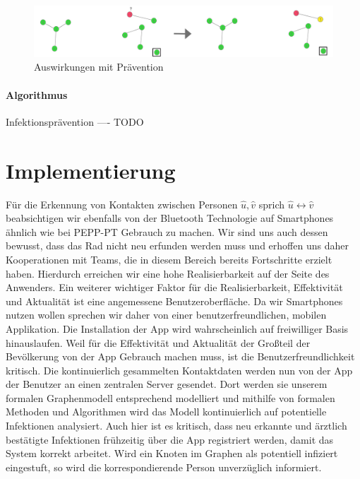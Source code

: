 \documentclass[12pt]{article}
\begin{document}
\begin{figure}[h]
    \centering
    \includegraphics[width=\textwidth]{res/prevention_proactive}
    \caption{Auswirkungen mit Prävention}
    \label{fig:prevention_proactive}
\end{figure}

\paragraph{Algorithmus} Infektionsprävention
---- TODO
\newpage

\section{Implementierung}
Für die Erkennung von Kontakten zwischen Personen $\hat{u}, \hat{v}$ sprich $\hat{u} \leftrightarrow \hat{v}$ beabsichtigen wir ebenfalls von der Bluetooth Technologie auf Smartphones ähnlich wie bei PEPP-PT Gebrauch zu machen. Wir sind uns auch dessen bewusst, dass das Rad nicht neu erfunden werden muss und erhoffen uns daher Kooperationen mit Teams, die in diesem Bereich bereits
Fortschritte erzielt haben. Hierdurch erreichen wir eine hohe Realisierbarkeit auf der Seite des Anwenders.
Ein weiterer wichtiger Faktor für die Realisierbarkeit, Effektivität und Aktualität ist eine angemessene Benutzeroberfläche. Da wir Smartphones nutzen wollen sprechen wir daher von einer benutzerfreundlichen, mobilen Applikation. Die Installation der App wird wahrscheinlich auf freiwilliger Basis hinauslaufen. Weil für die Effektivität und Aktualität der Großteil der Bevölkerung von der App Gebrauch machen muss, ist die Benutzerfreundlichkeit kritisch. Die kontinuierlich gesammelten Kontaktdaten werden nun von der App der Benutzer an einen zentralen Server gesendet. Dort werden sie unserem formalen Graphenmodell entsprech­end modelliert und mithilfe von formalen Methoden und Algorithmen wird das Modell kontinuierlich auf potentielle Infektionen analysiert. Auch hier ist es kritisch, dass
neu erkannte und ärztlich bestätigte Infektionen frühzeitig über die App registriert werden, damit das System korrekt arbeitet. Wird ein Knoten im Graphen als potentiell infiziert eingestuft, so wird die korrespondierende Person unverzüglich informiert.
\end{document}

